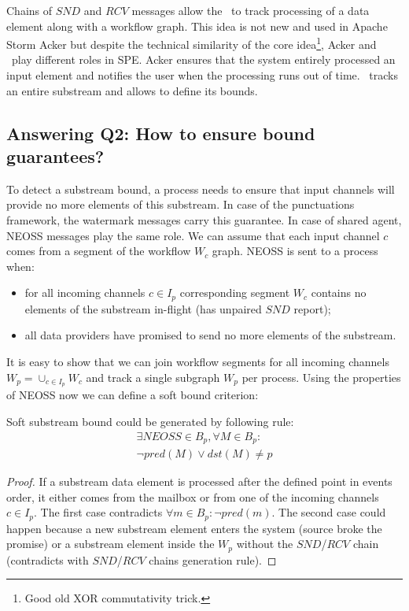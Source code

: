 Chains of $SND$ and $RCV$ messages allow the \tracker\ to track processing of a data element along with a workflow graph. This idea is not new and used in Apache Storm Acker but despite the technical similarity of the core idea\footnote{Good old XOR commutativity trick.}, Acker and \tracker\ play different roles in SPE. Acker ensures that the system entirely processed an input element and notifies the user when the processing runs out of time. \tracker\ tracks an entire substream and allows to define its bounds.

\subsection{Answering Q2: How to ensure bound guarantees?}
To detect a substream bound, a process needs to ensure that input channels will provide no more elements of this substream. In case of the punctuations framework, the watermark messages carry this guarantee. In case of shared agent, NEOSS messages play the same role. We can assume that each input channel $c$ comes from a segment of the workflow $W_c$ graph. NEOSS is sent to a process when:
\begin{itemize}
    \item for all incoming channels $c \in I_p$ corresponding segment $W_c$ contains no elements of the substream in-flight (has unpaired $SND$ report);
    \item all data providers have promised to send no more elements of the substream.
\end{itemize}
It is easy to show that we can join workflow segments for all incoming channels $W_p = \cup_{c\in I_p} W_c$ and track a single subgraph $W_p$ per process. Using the properties of NEOSS now we can define a soft bound criterion:
\begin{lemma}
Soft substream bound could be generated by following rule:
\begin{multline}
 \exists NEOSS \in B_p, \forall M\in B_p : \\ \neg pred(M) \vee dst(M) \ne p
\end{multline}
\end{lemma}
\begin{proof}
If a substream data element is processed after the defined point in events order, it either comes from the mailbox or from one of the incoming channels $c \in I_p$. The first case contradicts $\forall m\in B_p : \neg pred(m)$. The second case could happen because a new substream element enters the system (source broke the promise) or a substream element inside the $W_p$ without the $SND$/$RCV$ chain (contradicts with $SND$/$RCV$ chains generation rule). 
\end{proof}

